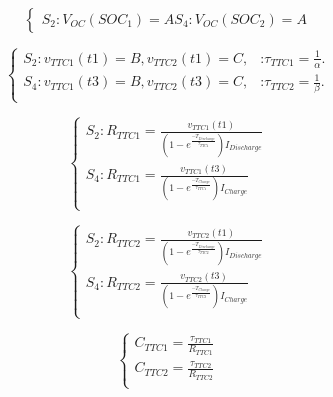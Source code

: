 \begin{equation}
	\begin{cases}
	  S_2 : V_{OC}(SOC_1) = A 
	  S_4 : V_{OC}(SOC_2) = A
	\end{cases}
\end{equation}

\begin{equation}\label{eq:Batt_OTC_Least_Square_solution}
	\begin{cases}
	  S_2 :  v_{TTC1}(t1) = B, v_{TTC2}(t1) = C ,& \text{:} \tau_{TTC1} = \frac{1}{\alpha}.\\
	  S_4 :  v_{TTC1}(t3) = B, v_{TTC2}(t3) = C ,& \text{:} \tau_{TTC2} = \frac{1}{\beta}.\\
	\end{cases}
\end{equation}

\begin{equation}\label{eq:Batt_TTC_R_TTC1}
	\begin{cases}
	  S_2 : R_{TTC1} = \frac{v_{TTC1}(t1)}{ \left( 1 - e^{\frac{- T_{Discharge} }{\tau_{TTC1} }}\right) I_{Discharge}} \\
	  S_4 : R_{TTC1} = \frac{v_{TTC1}(t3)}{ \left( 1 - e^{\frac{- T_{Charge} }{\tau_{TTC1} }}\right) I_{Charge}} \\
	\end{cases}
\end{equation}

\begin{equation}\label{eq:Batt_TTC_R_TTC2}
	\begin{cases}
	  S_2 : R_{TTC2} = \frac{v_{TTC2}(t1)}{ \left( 1 - e^{\frac{- T_{Discharge} }{\tau_{TTC2} }}\right) I_{Discharge}} \\
	  S_4 : R_{TTC2} = \frac{v_{TTC2}(t3)}{ \left( 1 - e^{\frac{- T_{Charge} }{\tau_{TTC2} }}\right) I_{Charge}} \\
	\end{cases}
\end{equation}

\begin{equation}\label{eq:Batt_TTC_C_TTC}
	\begin{cases}
		C_{TTC1} = \frac{\tau_{TTC1}}{R_{TTC1}} \\
		C_{TTC2} = \frac{\tau_{TTC2}}{R_{TTC2}} \\
	\end{cases}
\end{equation}

